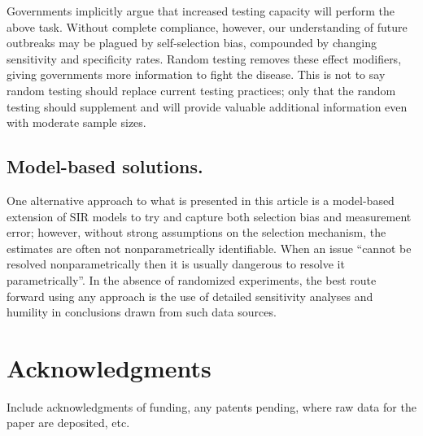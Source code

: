 \documentclass[12pt]{article}
\begin{document}
Governments implicitly argue that increased testing capacity will perform the above task.  Without complete compliance, however, our understanding of future outbreaks may be plagued by self-selection bias, compounded by changing sensitivity and specificity rates. Random testing removes these effect modifiers, giving governments more information to fight the disease.  This is not to say random testing should replace current testing practices; only that the random testing should supplement and will provide valuable additional information even with moderate sample sizes.


\subsection*{Model-based solutions.}

One alternative approach to what is presented in this article is a model-based extension of SIR models to try and capture both selection bias and measurement error; however, without strong assumptions on the selection mechanism, the estimates are often not nonparametrically identifiable.  When an issue ``cannot be resolved nonparametrically then it is usually dangerous to resolve it parametrically''\cite{CoxHink74}. In the absence of randomized experiments, the best route forward using any approach is the use of detailed sensitivity analyses and humility in conclusions drawn from such data sources.

% 






\section*{Acknowledgments}
Include acknowledgments of funding, any patents pending, where raw data for the paper are deposited, etc.
\end{document}
